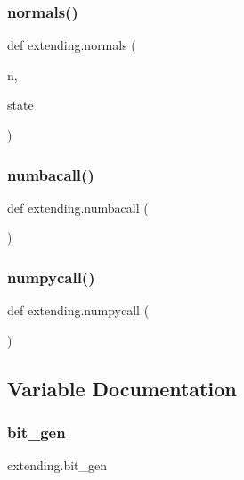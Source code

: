 \subsubsection{\texorpdfstring{normals()}{normals()}}
{\footnotesize\ttfamily def extending.\+normals (\begin{DoxyParamCaption}\item[{}]{n,  }\item[{}]{state }\end{DoxyParamCaption})}

\mbox{\label{namespaceextending_a4406ac784cc5c2435dec4e7f1e9a5147}} 
\subsubsection{\texorpdfstring{numbacall()}{numbacall()}}
{\footnotesize\ttfamily def extending.\+numbacall (\begin{DoxyParamCaption}{ }\end{DoxyParamCaption})}

\mbox{\label{namespaceextending_aeb6f21fd12d96f370964f44537a9f908}} 
\subsubsection{\texorpdfstring{numpycall()}{numpycall()}}
{\footnotesize\ttfamily def extending.\+numpycall (\begin{DoxyParamCaption}{ }\end{DoxyParamCaption})}



\subsection{Variable Documentation}
\mbox{\label{namespaceextending_a3a93d06c028a21ed5e3775c9d97b0437}} 
\subsubsection{\texorpdfstring{bit\+\_\+gen}{bit\_gen}}
{\footnotesize\ttfamily extending.\+bit\+\_\+gen}

